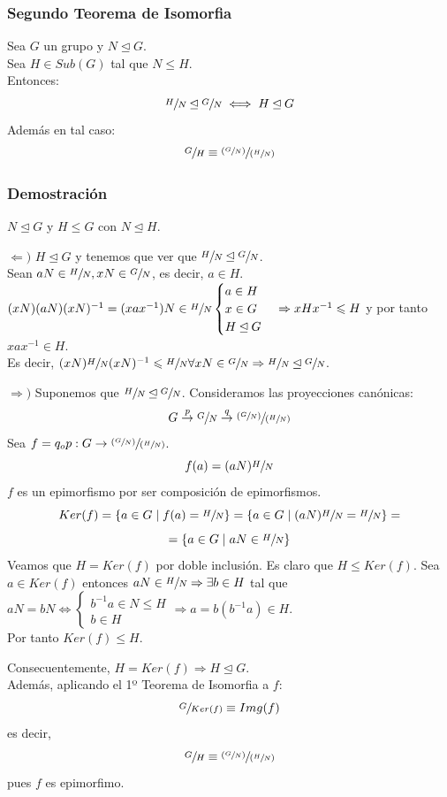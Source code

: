\documentclass[11pt,a4paper]{article}
\begin{document}
\subsubsection*{Segundo Teorema de Isomorfia}

Sea $G$ un grupo y $N \unlhd G$. \\
Sea $H \in Sub(G)$ tal que $N \leqslant H$. \\
Entonces:
$$\sfrac{H}{N} \unlhd \sfrac{G}{N} \iff H \unlhd G$$
Además en tal caso:
$$\sfrac{G}{H} \equiv \sfrac{(\sfrac{G}{N})}{(\sfrac{H}{N})}$$


\subsubsection*{Demostración}

$N \unlhd G$ y $H \leqslant G$ con $N \unlhd H$.
\begin{enumerate*}
\item[$\Leftarrow)$] $H \unlhd G$ y tenemos que ver que $\sfrac{H}{N} \unlhd \sfrac{G}{N}$. \\
Sean $aN \in \sfrac{H}{N}, xN \in \sfrac{G}{N}$, es decir, $a \in H$. \\
$(xN)(aN)(xN)^{-1} = (xax^{-1})N \in \sfrac{H}{N} \\
\begin{cases}
a \in H \\
x \in G \\
H \unlhd G
\end{cases}
\Rightarrow xHx^{-1} \leqslant H$ y por tanto $xax^{-1} \in H$. \\
Es decir, $(xN) \sfrac{H}{N} (xN)^{-1} \leqslant \sfrac{H}{N} \forall xN \in \sfrac{G}{N} \Rightarrow \sfrac{H}{N} \unlhd \sfrac{G}{N}$.
\item[$\Rightarrow)$] Suponemos que $\sfrac{H}{N} \unlhd \sfrac{G}{N}$. Consideramos las proyecciones canónicas: 
$$G \overset{p}{\to} \sfrac{G}{N} \overset{q}{\to} \sfrac{(\sfrac{G}{N})}{(\sfrac{H}{N})}$$
Sea $f = q_{o}p: G \to \sfrac{(\sfrac{G}{N})}{(\sfrac{H}{N})}$.
$$f(a) = (aN)\sfrac{H}{N}$$
$f$ es un epimorfismo por ser composición de epimorfismos.
$$Ker(f) = \{a \in G \mid f(a) = \sfrac{H}{N}\} = \{a \in G \mid (aN)\sfrac{H}{N} = \sfrac{H}{N}\} =$$ $$= \{a \in G \mid aN \in \sfrac{H}{N}\}$$
Veamos que $H = Ker(f)$ por doble inclusión. Es claro que $H \leqslant Ker(f)$. Sea $a \in Ker(f)$ entonces $aN \in \sfrac{H}{N} \Rightarrow \exists b \in H$ tal que $aN = bN \iff 
\begin{cases}
b^{-1}a \in N \leqslant H \\
b \in H
\end{cases}
\Rightarrow a = b(b^{-1}a) \in H$. \\
Por tanto $Ker(f) \leqslant H$.

Consecuentemente, $H = Ker(f) \Rightarrow H \unlhd G$. \\
Además, aplicando el 1º Teorema de Isomorfia a $f$:
$$\sfrac{G}{Ker(f)} \equiv Img(f)$$
es decir,
$$\sfrac{G}{H} \equiv \sfrac{(\sfrac{G}{N})}{(\sfrac{H}{N})}$$
pues $f$ es epimorfimo.
\end{enumerate*}
\end{document}
